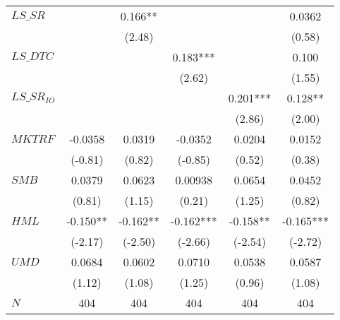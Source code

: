 \begin{tabular}{lccccc}
$LS\_SR$ &         & 0.166** &         &         & 0.0362 \\
        &         & (2.48)  &         &         & (0.58) \\
$LS\_DTC$ &         &         & 0.183*** &         & 0.100 \\
        &         &         & (2.62)  &         & (1.55) \\
$LS\_SR_{IO}$ &         &         &         & 0.201*** & 0.128** \\
        &         &         &         & (2.86)  & (2.00) \\
$MKTRF$ & -0.0358 & 0.0319  & -0.0352 & 0.0204  & 0.0152 \\
        & (-0.81) & (0.82)  & (-0.85) & (0.52)  & (0.38) \\
$SMB$   & 0.0379  & 0.0623  & 0.00938 & 0.0654  & 0.0452 \\
        & (0.81)  & (1.15)  & (0.21)  & (1.25)  & (0.82) \\
$HML$   & -0.150** & -0.162** & -0.162*** & -0.158** & -0.165*** \\
        & (-2.17) & (-2.50) & (-2.66) & (-2.54) & (-2.72) \\
$UMD$   & 0.0684  & 0.0602  & 0.0710  & 0.0538  & 0.0587 \\
        & (1.12)  & (1.08)  & (1.25)  & (0.96)  & (1.08) \bigstrut[b]\\
\hline
$N$     & 404     & 404     & 404     & 404     & 404 \bigstrut\\
\hline
\hline
\end{tabular}%
